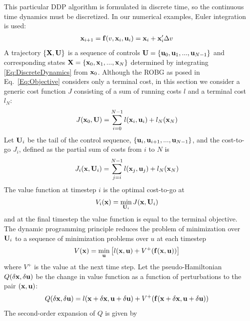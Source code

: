 This particular DDP algorithm is formulated in discrete time, so the continuous time dynamics must be discretized. In our numerical examples, Euler integration is used:
\begin{align}
	\mathbf{x}_{i+1} = \mathbf{f}(v, \mathbf{x}_i,\mathbf{u}_i) = \mathbf{x}_i + \mathbf{x}_i'\Delta v \label{Eq:DiscreteDynamics}
\end{align}
A trajectory $\{\mathbf{X},\mathbf{U}\}$ is a sequence of controls $ \mathbf{U}=\{\mathbf{u}_0,\mathbf{u}_1,...,\mathbf{u}_{N-1}\} $ and corresponding states $\mathbf{X}=\{\mathbf{x}_0,\mathbf{x}_1,...,\mathbf{x}_N\}$ determined by integrating \eqref{Eq:DiscreteDynamics} from $\mathbf{x}_0$.
Although the ROBG as posed in Eq.~\eqref{Eq:Objective} considers only a terminal cost, in this section we consider a generic cost function $J$ consisting of a sum of running costs $l$ and a terminal cost $l_N$:
\begin{align}
	J(\mathbf{x}_0,\mathbf{U}) = \sum_{i=0}^{N-1}l(\mathbf{x}_i,\mathbf{u}_i) + l_N(\mathbf{x}_N)
\end{align}
Let $\mathbf{U}_i$ be the tail of the control sequence, $\{\mathbf{u}_i,\mathbf{u}_{i+1},...,\mathbf{u}_{N-1}\}$, and the cost-to-go $J_i$, defined as the partial sum of costs from $i$ to $N$ is
\begin{align}
	J_i(\mathbf{x},\mathbf{U}_i) = \sum_{j=i}^{N-1}l(\mathbf{x}_j,\mathbf{u}_j) + l_N(\mathbf{x}_N)
\end{align}
The value function at timestep $i$ is the optimal cost-to-go at \state
\begin{align}
	V_i(\mathbf{x}) = \min_{\mathbf{U}_i} J(\mathbf{x}, \mathbf{U}_i)
\end{align}
and at the final timestep the value function is equal to the terminal objective. The dynamic programming principle reduces the problem of minimization over $\mathbf{U}_i$ to a sequence of minimization problems over $u$ at each timestep 
\begin{align}
	V(\mathbf{x}) = \min_{\mathbf{u}}\left[l(\mathbf{x},\mathbf{u}) + V^+(\mathbf{f}(\mathbf{x},\mathbf{u}))\right] \label{eq_dynamic_programming}
\end{align}
where $V^+$ is the value at the next time step.
Let the pseudo-Hamiltonian $Q(\delta\mathbf{x},\delta\mathbf{u})$ be the change in value function as a function of perturbations to the pair $(\mathbf{x},\mathbf{u})$:
\begin{align}
	Q(\delta\mathbf{x},\delta\mathbf{u}) = l(\mathbf{x}+\delta\mathbf{x},\mathbf{u}+\delta\mathbf{u}) + V^+(\mathbf{f}(\mathbf{x}+\delta\mathbf{x},\mathbf{u}+\delta\mathbf{u}))
\end{align}
The second-order expansion of $ Q $ is given by
